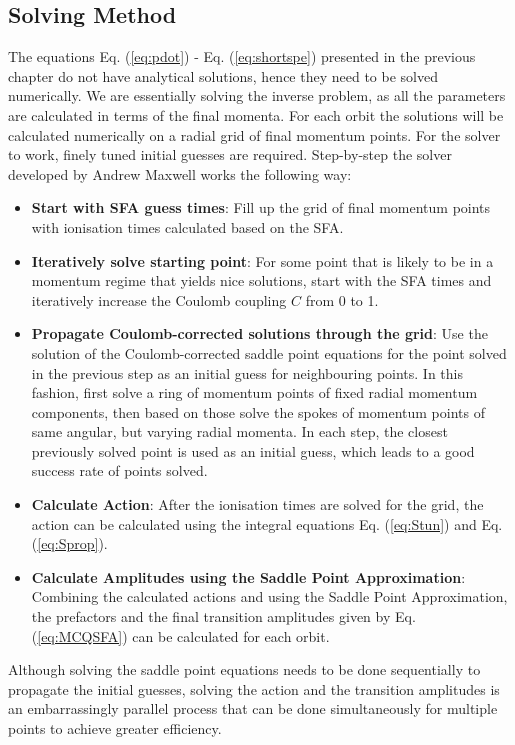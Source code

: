 \documentclass[11pt]{article}
\numberwithin{equation}{section}
\begin{document}
\subsection{Solving Method}
The equations Eq. (\ref{eq:pdot}) - Eq. (\ref{eq:shortspe}) presented in the previous chapter do not have analytical solutions, hence they need to be solved numerically. We are essentially solving the inverse problem, as all the parameters are calculated in terms of the final momenta. For each orbit the solutions will be calculated numerically on a radial grid of final momentum points. For the solver to work, finely tuned initial guesses are required. Step-by-step the solver developed by Andrew Maxwell\cite{maxwell_2019_strongfield} works the following way:
\begin{itemize}
    \item \textbf{Start with SFA guess times}: Fill up the grid of final momentum points with ionisation times calculated based on the SFA.
    \item \textbf{Iteratively solve starting point}: For some point that is likely to be in a momentum regime that yields nice solutions, start with the SFA times and iteratively increase the Coulomb coupling $C$ from 0 to 1.
    \item \textbf{Propagate Coulomb-corrected solutions through the grid}: Use the solution of the Coulomb-corrected saddle point equations for the point solved in the previous step as an initial guess for neighbouring points. In this fashion, first solve a ring of momentum points of fixed radial momentum components, then based on those solve the spokes of momentum points of same angular, but varying radial momenta. In each step, the closest previously solved point is used as an initial guess, which leads to a good success rate of points solved.
    \item \textbf{Calculate Action}: After the ionisation times are solved for the grid, the action can be calculated using the integral equations Eq. (\ref{eq:Stun}) and Eq. (\ref{eq:Sprop}).
    \item \textbf{Calculate Amplitudes using the Saddle Point Approximation}: Combining the calculated actions and using the Saddle Point Approximation, the prefactors and the final transition amplitudes given by Eq. (\ref{eq:MCQSFA}) can be calculated for each orbit. 
\end{itemize}
Although solving the saddle point equations needs to be done sequentially to propagate the initial guesses, solving the action and the transition amplitudes is an embarrassingly parallel process that can be done simultaneously for multiple points to achieve greater efficiency.
\end{document}
